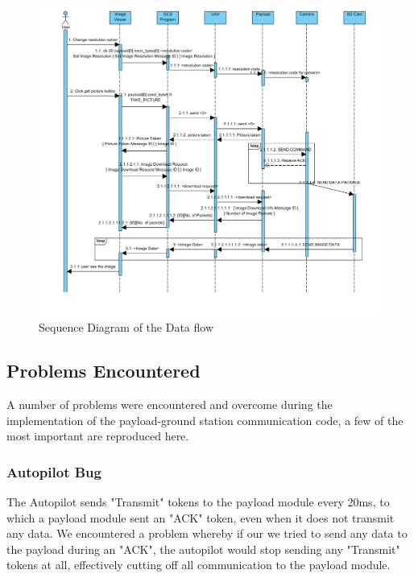 \begin{figure}[H]
\begin{center}
\includegraphics[width=1.00\textwidth]{figures/sequence_diagram.png} 
\end{center}
\caption{Sequence Diagram of the Data flow\label{sequence diagram}}
\end{figure}


\subsection{Problems Encountered}
A number of problems were encountered and overcome during the implementation of the payload-ground station
communication code, a few of the most important are reproduced here.

\subsubsection*{Autopilot Bug}

The Autopilot sends "Transmit" tokens to the payload module every 20ms, 
to which a payload module sent an "ACK" token, even when it does not 
transmit any data. We encountered a problem whereby if our we tried to 
send any data to the payload during an "ACK", the autopilot would stop 
sending any "Transmit" tokens at all, effectively cutting off all 
communication to the payload module.

